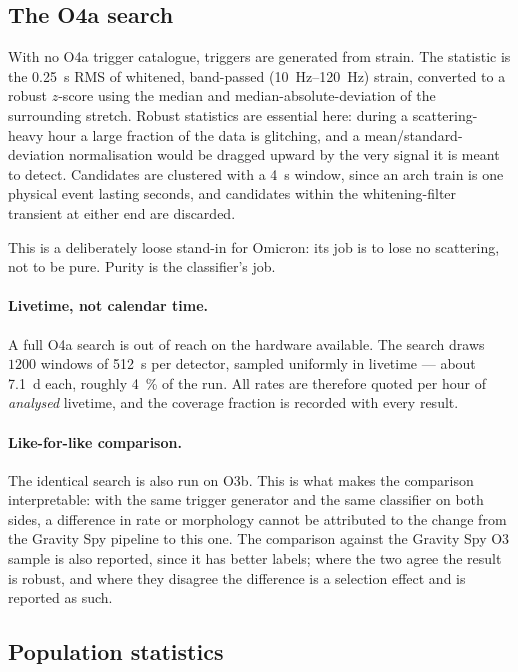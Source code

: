 \subsection{The O4a search}
\label{sec:methods:search}

With no O4a trigger catalogue, triggers are generated from strain. The
statistic is the \SI{0.25}{\second} RMS of whitened, band-passed
(\SIrange{10}{120}{\hertz}) strain, converted to a robust $z$-score using the
median and median-absolute-deviation of the surrounding stretch. Robust
statistics are essential here: during a scattering-heavy hour a large fraction
of the data is glitching, and a mean/standard-deviation normalisation would be
dragged upward by the very signal it is meant to detect. Candidates are
clustered with a \SI{4}{\second} window, since an arch train is one physical
event lasting seconds, and candidates within the whitening-filter transient at
either end are discarded.

This is a deliberately loose stand-in for Omicron: its job is to lose no
scattering, not to be pure. Purity is the classifier's job.

\paragraph{Livetime, not calendar time.} A full O4a search is out of reach on
the hardware available. The search draws $1200$ windows of \SI{512}{\second}
per detector, sampled uniformly in livetime --- about \SI{7.1}{\day} each,
roughly \SI{4}{\percent} of the run. All rates are therefore quoted per hour of
\emph{analysed} livetime, and the coverage fraction is recorded with every
result.

\paragraph{Like-for-like comparison.} The identical search is also run on O3b.
This is what makes the comparison interpretable: with the same trigger
generator and the same classifier on both sides, a difference in rate or
morphology cannot be attributed to the change from the Gravity Spy pipeline to
this one. The comparison against the Gravity Spy O3 sample is also reported,
since it has better labels; where the two agree the result is robust, and
where they disagree the difference is a selection effect and is reported as
such.

\subsection{Population statistics}
\label{sec:methods:stats}

